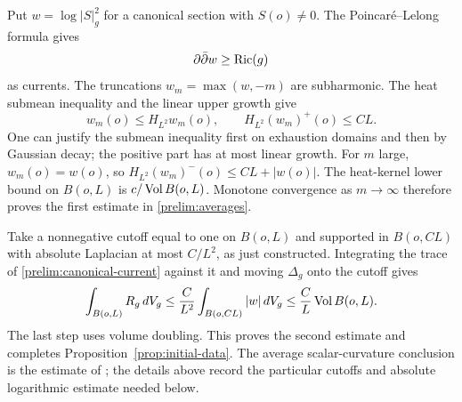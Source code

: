 Put $w=\log|S|_g^2$ for a canonical section with $S(o)\ne0$.
The Poincar\'e--Lelong formula gives
\begin{equation}\label{prelim:canonical-current}
 \partial\bar\partial w\ge\operatorname{Ric}(g)
\end{equation}
as currents.  The truncations $w_m=\max(w,-m)$ are subharmonic.
The heat submean inequality and the linear upper growth give
\[
 w_m(o)\le H_{L^2}w_m(o),\qquad
 H_{L^2}(w_m)^+(o)\le CL.
\]
One can justify the submean inequality first on exhaustion domains
and then by Gaussian decay; the positive part has at most linear
growth.  For $m$ large, $w_m(o)=w(o)$, so
$H_{L^2}(w_m)^-(o)\le CL+|w(o)|$.  The heat-kernel lower bound on
$B(o,L)$ is $c/\operatorname{Vol} B(o,L)$.  Monotone convergence as $m\to\infty$
therefore proves the first estimate in \eqref{prelim:averages}.

Take a nonnegative cutoff equal to one on $B(o,L)$ and supported in
$B(o,CL)$ with absolute Laplacian at most $C/L^2$, as just constructed.
Integrating the trace of \eqref{prelim:canonical-current} against it
and moving $\Delta_g$ onto the cutoff gives
\[
 \int_{B(o,L)}R_g\,dV_g
 \le \frac{C}{L^2}\int_{B(o,CL)}|w|\,dV_g
 \le \frac{C}{L}\operatorname{Vol} B(o,L).
\]
The last step uses volume doubling.  This proves the second estimate
and completes Proposition~\ref{prop:initial-data}.  The average
scalar-curvature conclusion is the estimate of
\cite[Theorem~2]{ChenZhu}; the details above record the particular
cutoffs and absolute logarithmic estimate needed below.

